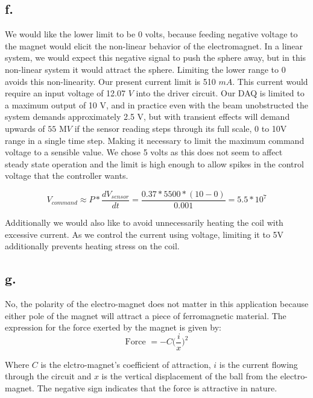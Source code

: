 \documentclass{article}
\theoremstyle{plain}
\theoremstyle{definition}
\theoremstyle{remark}
\begin{document}
\subsection*{f.}  We would like the lower limit to be 0 volts, because feeding negative voltage to the magnet would elicit the non-linear behavior of the electromagnet.  In a linear system, we would expect this negative signal to push the sphere away, but in this non-linear system it would attract the sphere.  Limiting the lower range to 0 avoids this non-linearity.  
Our present current limit is 510 $mA$.  This current would require an input voltage of 12.07 $V$ into the driver circuit.  Our DAQ is limited to a maximum output of 10 V, and in practice even with the beam unobstructed the system demands approximately 2.5 V, but with transient effects will demand upwards of $55$ M$V$ if the sensor reading steps through its full scale, 0 to 10V range in a single time step. Making it necessary to limit the maximum command voltage to a sensible value.  We chose 5 volts as this does not seem to affect steady state operation and the limit is high enough to allow spikes in the control voltage that the controller wants.

$$V_{command} \approx P * \frac{dV_{sensor}}{dt}  = \frac{0.37 * 5500 * (10 - 0)}{0.001} = 5.5*10^7$$


Additionally we would also like to avoid unnecessarily heating the coil with excessive current. As we control the current using voltage, limiting it to 5V additionally prevents heating stress on the coil.

\subsection*{g.}
No, the polarity of the electro-magnet does not matter in this application because either pole of the magnet will attract a piece of ferromagnetic material.  The expression for the force exerted by the magnet is given by:
$$\text{Force } = -C\Big(\frac{i}{x}\Big)^2$$

Where $C$ is the elctro-magnet's coefficient of attraction, $i$ is the current flowing through the circuit and $x$ is the vertical displacement of the ball from the electro-magnet. The negative sign indicates that the force is attractive in nature.\\
\end{document}
